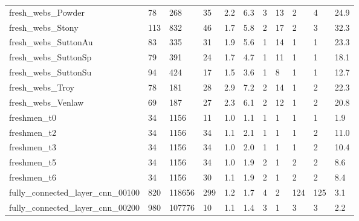 \begin{longtable}{lllllllllll}
 fresh\_webs\_Powder                                  & 78         & 268       & 35    & 2.2    & 6.3    & 3     & 13     & 2      & 4      & 24.9    \\
 fresh\_webs\_Stony                                   & 113        & 832       & 46    & 1.7    & 5.8    & 2     & 17     & 2      & 3      & 32.3    \\
 fresh\_webs\_SuttonAu                                & 83         & 335       & 31    & 1.9    & 5.6    & 1     & 14     & 1      & 1      & 23.3    \\
 fresh\_webs\_SuttonSp                                & 79         & 391       & 24    & 1.7    & 4.7    & 1     & 11     & 1      & 1      & 18.1    \\
 fresh\_webs\_SuttonSu                                & 94         & 424       & 17    & 1.5    & 3.6    & 1     & 8      & 1      & 1      & 12.7    \\
 fresh\_webs\_Troy                                    & 78         & 181       & 28    & 2.9    & 7.2    & 2     & 14     & 1      & 2      & 22.3    \\
 fresh\_webs\_Venlaw                                  & 69         & 187       & 27    & 2.3    & 6.1    & 2     & 12     & 1      & 2      & 20.8    \\
 freshmen\_t0                                        & 34         & 1156      & 11    & 1.0    & 1.1    & 1     & 1      & 1      & 1      & 1.9     \\
 freshmen\_t2                                        & 34         & 1156      & 34    & 1.1    & 2.1    & 1     & 1      & 1      & 2      & 11.0    \\
 freshmen\_t3                                        & 34         & 1156      & 34    & 1.0    & 2.0    & 1     & 1      & 1      & 2      & 10.4    \\
 freshmen\_t5                                        & 34         & 1156      & 34    & 1.0    & 1.9    & 2     & 1      & 2      & 2      & 8.6     \\
 freshmen\_t6                                        & 34         & 1156      & 30    & 1.1    & 1.9    & 2     & 1      & 2      & 2      & 8.4     \\
 fully\_connected\_layer\_cnn\_00100                    & 820        & 118656    & 299   & 1.2    & 1.7    & 4     & 2      & 124    & 125    & 3.1     \\
 fully\_connected\_layer\_cnn\_00200                    & 980        & 107776    & 10    & 1.1    & 1.4    & 3     & 1      & 3      & 3      & 2.2     \\

\end{longtable}
